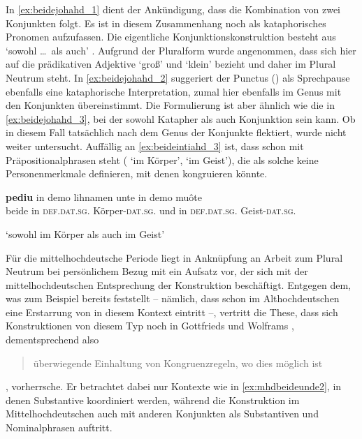 In \cref{ex:beidejohahd_1} dient  der Ankündigung, dass die
Kombination von zwei Konjunkten folgt. Es ist in diesem Zusammenhang noch als
kataphorisches Pronomen aufzufassen. Die eigentliche Konjunktionskonstruktion
besteht aus  `sowohl \dots\ als auch'
\autocite[vgl.][169]{schuetzeichel2012}. Aufgrund der Pluralform wurde
angenommen, dass  sich hier auf die prädikativen Adjektive
 `groß' und 
`klein' bezieht und daher im Plural Neutrum steht. In
\cref{ex:beidejohahd_2} suggeriert der Punctus () als Sprechpause
ebenfalls eine kataphorische Interpretation, zumal  hier ebenfalls
im Genus mit den Konjunkten übereinstimmt. Die Formulierung ist aber ähnlich
wie die in \cref{ex:beidejohahd_3}, bei der  sowohl Katapher als
auch Konjunktion sein kann. Ob  in diesem Fall tatsächlich nach
dem Genus der Konjunkte flektiert, wurde nicht weiter untersucht.
Auffällig an \cref{ex:beideintiahd_3} ist, dass  schon mit
Präpositionalphrasen steht ( `im Körper',
 `im Geist'), die als solche keine Personenmerkmale
definieren, mit denen  kongruieren könnte.

\begin{exe}
\ex \label{ex:beideintiahd_3}
	\gll \textbf{pediu} in demo lihnamen unte in demo muôte \\
		beide in \textsc{def.dat.sg.\MascI} Körper-\textsc{dat.sg.\MascI} und in
			\textsc{def.dat.sg.\MascI} Geist-\textsc{dat.sg.\MascI} \\
	\begin{taggedline}{\parencite[APB\_PredigtsammlungB, 1732--1739]{ddd}}
	\trans `sowohl im Körper als auch im Geist'
	\end{taggedline}
\end{exe}

Für die mittelhochdeutsche Periode liegt in Anknüpfung an
 Arbeit zum Plural Neutrum bei persönlichem Bezug mit
\citet{askedal1974} ein Aufsatz vor, der sich mit der mittelhochdeutschen
Entsprechung der Konstruktion  beschäftigt. Entgegen
dem, was zum Beispiel bereits \citet[433--434]{behaghel1923} feststellt --
nämlich, dass schon im Althochdeutschen eine Erstarrung von  in
diesem Kontext eintritt --, vertritt \citeauthor{askedal1974} die These, dass
sich Konstruktionen von diesem Typ noch in Gottfrieds
\nocite{maroldschroeder1969} und Wolframs
\nocite{lachmannhartl1952} ,
dementsprechend also \blockcquote[37]{askedal1974}{überwiegende Einhaltung von
Kongruenzregeln, wo dies möglich ist}, vorherrsche. Er betrachtet dabei nur
Kontexte wie in \cref{ex:mhdbeideunde2}, in denen Substantive koordiniert
werden, während die Konstruktion im Mittelhochdeutschen auch mit anderen
Konjunkten als Substantiven und Nominalphrasen auftritt.

